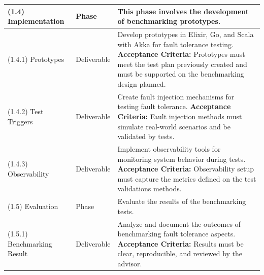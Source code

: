 \begin{longtable}{|p{3cm}|p{2.5cm}|p{8cm}|}
    (1.4) Implementation           & Phase                 & This phase involves the development of benchmarking prototypes.                                                                                                                                                                                                                                                                                           \\ \hline
    (1.4.1) Prototypes             & Deliverable           & Develop prototypes in Elixir, Go, and Scala with Akka for fault tolerance testing. \newline \textbf{Acceptance Criteria:} Prototypes must meet the test plan previously created and must be supported on the benchmarking design planned.                                                                                                                 \\ \hline
    (1.4.2) Test Triggers          & Deliverable           & Create fault injection mechanisms for testing fault tolerance. \newline \textbf{Acceptance Criteria:} Fault injection methods must simulate real-world scenarios and be validated by tests.                                                                                                                                                               \\ \hline
    (1.4.3) Observability          & Deliverable           & Implement observability tools for monitoring system behavior during tests. \newline \textbf{Acceptance Criteria:} Observability setup must capture the metrics defined on the test validations methods.                                                                                                                                                   \\ \hline
    \hline 

    (1.5) Evaluation               & Phase                 & Evaluate the results of the benchmarking tests.                                                                                                                                                                                                                                                                                                           \\ \hline
    (1.5.1) Benchmarking Result    & Deliverable           & Analyze and document the outcomes of benchmarking fault tolerance aspects. \newline \textbf{Acceptance Criteria:} Results must be clear, reproducible, and reviewed by the advisor.                                                                                                                                                                       \\ \hline
    \hline 


\end{longtable}
